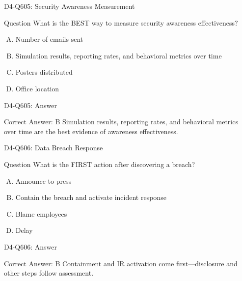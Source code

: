 \documentclass{beamer}
\begin{document}
	\begin{frame}{D4-Q605: Security Awareness Measurement}
		\begin{block}{Question}
			What is the BEST way to measure security awareness effectiveness?
		\end{block}
		\begin{enumerate}[(A)]
			\item Number of emails sent
			\item Simulation results, reporting rates, and behavioral metrics over time
			\item Posters distributed
			\item Office location
		\end{enumerate}
	\end{frame}
	\begin{frame}{D4-Q605: Answer}
		\begin{block}{Correct Answer: B}
			Simulation results, reporting rates, and behavioral metrics over time are the best evidence of awareness effectiveness.
		\end{block}
	\end{frame}
	
	\begin{frame}{D4-Q606: Data Breach Response}
		\begin{block}{Question}
			What is the FIRST action after discovering a breach?
		\end{block}
		\begin{enumerate}[(A)]
			\item Announce to press
			\item Contain the breach and activate incident response
			\item Blame employees
			\item Delay
		\end{enumerate}
	\end{frame}
	\begin{frame}{D4-Q606: Answer}
		\begin{block}{Correct Answer: B}
			Containment and IR activation come first—disclosure and other steps follow assessment.
		\end{block}
	\end{frame}
	
\end{document}
